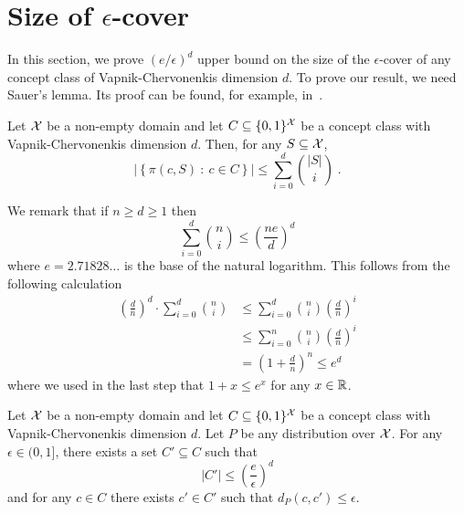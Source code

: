\section{Size of $\epsilon$-cover}
\label{section:epsilon-cover}

In this section, we prove $(e/\epsilon)^d$ upper bound on the size of the
$\epsilon$-cover of any concept class of Vapnik-Chervonenkis dimension $d$. To
prove our result, we need Sauer's lemma. Its proof can be found, for example,
in~\citet[Chapter 3]{Anthony-Bartlett-1999}.

\begin{lemma}
Let $\mathcal{X}$ be a non-empty domain and let $C \subseteq \{0,1\}^{\mathcal{X}}$ be a concept class
with Vapnik-Chervonenkis dimension $d$. Then, for any $S \subseteq \mathcal{X}$,
$$
\left| \left\{ \pi(c, S) ~:~ c \in C \right\} \right| \le \sum_{i=0}^d \binom{|S|}{i} \; .
$$
\end{lemma}

We remark that if $n \ge d \ge 1$ then
\begin{equation}
\label{equation:sauer-lemma-estimate}
\sum_{i=0}^d \binom{n}{i} \le \left( \frac{ne}{d} \right)^d
\end{equation}
where $e = 2.71828 \dots$ is the base of the natural logarithm. This follows
from the following calculation
\begin{align*}
\left( \frac{d}{n} \right)^d \cdot \sum_{i=0}^d \binom{n}{i}
& \le \sum_{i=0}^d \binom{n}{i} \left( \frac{d}{n} \right)^i \\
& \le \sum_{i=0}^n \binom{n}{i} \left( \frac{d}{n} \right)^i \\
& = \left(1 + \frac{d}{n} \right)^n \le e^d
\end{align*}
where we used in the last step that $1 + x \le e^x$ for any $x \in \mathbb{R}$.

\begin{theorem}
Let $\mathcal{X}$ be a non-empty domain and let $C \subseteq \{0,1\}^{\mathcal{X}}$ be a concept
class with Vapnik-Chervonenkis dimension $d$. Let $P$ be any distribution over
$\mathcal{X}$. For any $\epsilon \in (0,1]$, there exists a set $C' \subseteq C$ such that
\begin{equation}
\label{equation:theorem-epsilon-cover}
|C'| \le \left( \frac{e}{\epsilon} \right)^d
\end{equation}
and for any $c \in C$ there exists $c' \in C'$ such that $d_P(c,c') \le \epsilon$.
\end{theorem}

